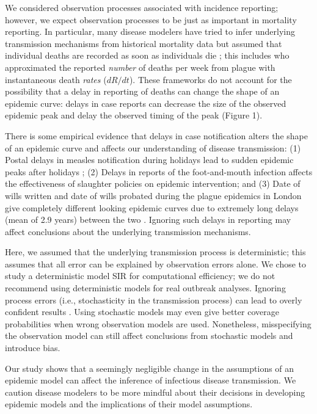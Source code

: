 \documentclass[12pt]{article}\usepackage[]{graphicx}\usepackage[]{color}
\begin{document}
We considered observation processes associated with incidence 
reporting; however, we expect observation processes to be just as important
in mortality reporting. In particular, many disease modelers have
tried to infer underlying transmission mechanisms from historical mortality 
data but assumed that individual deaths are recorded as soon as individuals die 
\citep{he2013inferring, didelot2017model, dean2018human}; this includes
\cite{kermack1927contribution} who approximated the reported \emph{number} of
deaths per week from plague with instantaneous death \emph{rates} ($dR/dt$).
These frameworks do not account for the possibility 
that a delay in reporting of deaths can
change the shape of an epidemic curve: delays in case reports can decrease
the size of the observed epidemic peak and delay the observed timing of the peak (Figure 1). 

There is some empirical evidence that delays in case notification alters the
shape of an epidemic curve and affects our understanding of disease transmission:
(1) Postal delays in measles notification during holidays lead to sudden
epidemic peaks after holidays \citep{fine1982measles}; 
(2) Delays in reports of the foot-and-mouth infection affects the effectiveness
of slaughter policies on epidemic intervention;
and (3) Date of wills written and date of wills probated during
the plague epidemics in London give completely different looking epidemic curves
due to extremely long delays (mean of 2.9 years) between the two \citep{bushby2019wills}.
Ignoring such delays in reporting may affect conclusions about the underlying 
transmission mechanisms.

Here, we assumed that the underlying transmission process is deterministic; this 
assumes that all error can be explained by observation errors alone. 
We chose to study a deterministic model SIR for computational efficiency; 
we do not recommend using deterministic models for real outbreak analyses.
Ignoring process errors (i.e., stochasticity in the transmission process) can lead to
overly confident results \citep{king2015avoidable}. Using stochastic models may
even give better coverage probabilities when wrong observation models are used. 
Nonetheless, misspecifying the observation model can still affect conclusions from 
stochastic models and introduce bias.

Our study shows that a seemingly negligible change in the assumptions of an epidemic
model can affect the inference of infectious disease transmission.
We caution disease modelers to be more mindful about their decisions in developing
epidemic models and the implications of their model assumptions.


\end{document}
